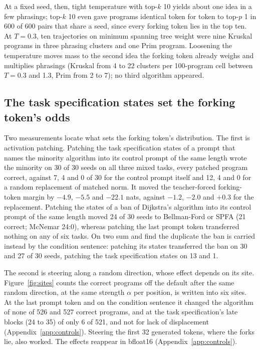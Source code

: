 \documentclass[11pt,letterpaper]{article}
\begin{document}
At a fixed seed, then, tight temperature with top-$k$ 10 yields about one idea in a few phrasings; top-$k$ 10 even gave programs identical token for token to top-$p$ 1 in 600 of 600 pairs that share a seed, since every forking token lies in the top ten. At $T = 0.3$, ten trajectories on minimum spanning tree weight were nine Kruskal programs in three phrasing clusters and one Prim program. Loosening the temperature moves mass to the second idea the forking token already weighs and multiplies phrasings (Kruskal from 4 to 22 clusters per 100-program cell between $T = 0.3$ and 1.3, Prim from 2 to 7); no third algorithm appeared.

\subsection{The task specification states set the forking token's odds}
\label{sec:res-states}

Two measurements locate what sets the forking token's distribution. The first is activation patching. Patching the task specification states of a prompt that names the minority algorithm into its control prompt of the same length wrote the minority on 30 of 30 seeds on all three mixed tasks, every patched program correct, against 7, 4 and 0 of 30 for the control prompt itself and 12, 4 and 0 for a random replacement of matched norm. It moved the teacher-forced forking-token margin by $-4.9$, $-5.5$ and $-22.1$ nats, against $-1.2$, $-2.0$ and $+0.3$ for the replacement. Patching the states of a ban of Dijkstra's algorithm into its control prompt of the same length moved 24 of 30 seeds to Bellman-Ford or SPFA (21 correct; McNemar 24:0), whereas patching the last prompt token transferred nothing on any of six tasks. On two sum and find the duplicate the ban is carried instead by the condition sentence: patching its states transferred the ban on 30 and 27 of 30 seeds, patching the task specification states on 13 and 1.

The second is steering along a random direction, whose effect depends on its site. Figure~\ref{fig:sites} counts the correct programs off the default after the same random direction, at the same strength $\alpha$ per position, is written into six sites. At the last prompt token and on the condition sentence it changed the algorithm of none of 526 and 527 correct programs, and at the task specification's late blocks (24 to 35) of only 6 of 521, and not for lack of displacement (Appendix~\ref{app:controls}). Steering the first 32 generated tokens, where the forks lie, also worked. The effects reappear in bfloat16 (Appendix~\ref{app:controls}).
\end{document}
